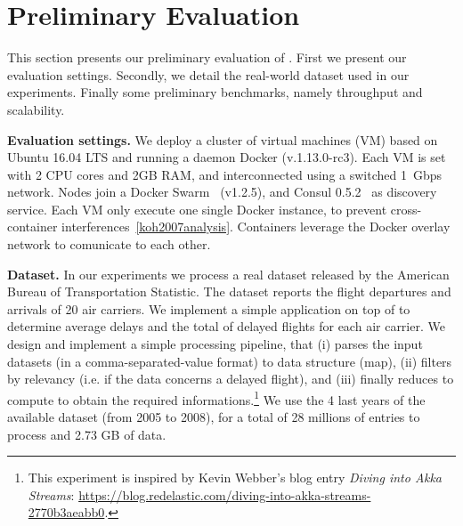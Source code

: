 \section{Preliminary Evaluation}
\label{sec:eval}

This section presents our preliminary evaluation of \SYS.
First we present our evaluation settings.
Secondly, we detail the real-world dataset used in our experiments.
Finally some preliminary benchmarks, namely throughput and scalability.

\textbf{Evaluation settings.} We deploy a cluster of virtual machines (VM) based on Ubuntu 16.04 LTS and running a daemon Docker (v.1.13.0-rc3).
Each VM is set with 2 CPU cores and 2GB RAM, and interconnected using a switched 1~Gbps network.
Nodes join a Docker Swarm~\cite{docker:swarm_2016} (v1.2.5), and Consul 0.5.2~\cite{consul} as discovery service.
Each VM only execute one single Docker instance, to prevent cross-container interferences~\ref{koh2007analysis}.
Containers leverage the Docker overlay network to comunicate to each other.

\textbf{Dataset.} In our experiments we process a real dataset released by the American Bureau of Transportation Statistic\cite{rita:bts}.
The dataset reports the flight departures and arrivals of 20 air carriers\cite{statistical_computing:data}.%
We implement a simple application on top of \SYS to determine average delays and the total of delayed flights for each air carrier.
We design and implement a simple processing pipeline, that (i) parses the input datasets (in a comma-separated-value format) to data structure (map), (ii) filters by relevancy (i.e. if the data concerns a delayed flight), and (iii) finally reduces to compute to obtain the required informations.\footnote{This experiment is inspired by Kevin Webber's blog entry \emph{Diving into Akka Streams}: \url{https://blog.redelastic.com/diving-into-akka-streams-2770b3aeabb0}.}
We use the 4 last years of the available dataset (from 2005 to 2008), for a total of 28 millions of entries to process and 2.73 GB of data.


